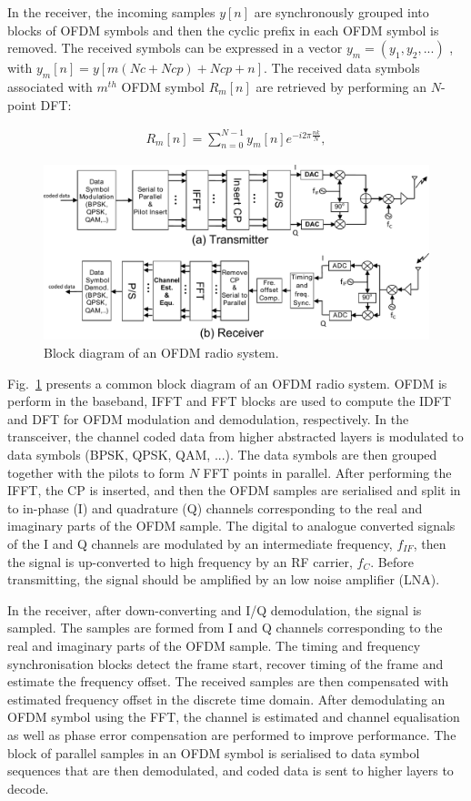 In the receiver, the incoming samples $y[n]$ are synchronously grouped into blocks of OFDM symbols and then the cyclic prefix in each OFDM symbol is removed.
The received symbols can be expressed in a vector $y_{m} = (y_{1}, y_{2}, . . . )$ , with $y_{m}[n]=y[m(Nc+Ncp)+Ncp +n]$.
The received data symbols associated with $m^{th}$ OFDM symbol $R_{m}[n]$ are retrieved by performing an $N$-point DFT:

\begin{eqnarray}
\label{equ:receiveOFDMsymbol}
R_{m}[n] =  \sum_{n=0}^{N-1} y_{m}[n]e^{-i2\pi \frac{nk}{N}},
\end{eqnarray}

\begin{figure}
	\centerline{\includegraphics [width=0.8\columnwidth] {Figures/OFDM-block.pdf} }
	\caption{Block diagram of an OFDM radio system.}
	\label{fig:OFDM-block}
\end{figure}

Fig.~\ref{fig:OFDM-block} presents a common block diagram of an OFDM radio system.
OFDM is perform in the baseband, IFFT and FFT blocks are used to compute the IDFT and DFT for OFDM modulation and demodulation, respectively.
In the transceiver, the channel coded data from higher abstracted layers is modulated to data symbols (BPSK, QPSK, QAM, ...). The data symbols are then grouped together with the pilots to form $N$ FFT points in parallel.
After performing the IFFT, the CP is inserted, and then the OFDM samples are serialised and split in to in-phase (I) and quadrature (Q) channels corresponding to the real and imaginary parts of  the OFDM sample.
The digital to analogue converted signals of the I and Q channels are modulated by an intermediate frequency, $f_{IF}$, then the signal is up-converted to high frequency by an RF carrier, $f_{C}$.
Before transmitting, the signal should be amplified by an low noise amplifier (LNA).

In the receiver, after down-converting and I/Q demodulation, the signal is sampled. The samples are formed from I and Q channels corresponding to the real and imaginary parts of the OFDM sample.
The timing and frequency synchronisation blocks detect the frame start, recover timing of the frame and estimate the frequency offset.
The received samples are then compensated with estimated frequency offset in the discrete time domain.
After demodulating an OFDM symbol using the FFT, the channel is estimated and channel equalisation as well as phase error compensation are performed to improve performance.
The block of parallel samples in an OFDM symbol is serialised to data symbol sequences that are then demodulated, and coded data is sent to higher layers to decode.

